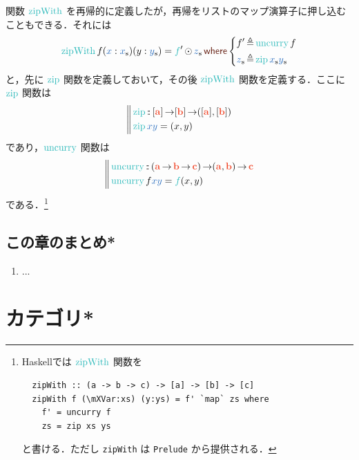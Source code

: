\documentclass[a5paper,twoside,fleqn,draft]{jsbook}
\def\keywordColor{Sepia}
\def\varColor{NavyBlue}
\def\funcColor{BlueGreen}
\def\typeColor{RedOrange}
\newcommand{\programminglanguage}[1]{\textsf{#1}}
\newcommand{\haskell}{\programminglanguage{Haskell}}
\newcommand{\code}[1]{\texttt{#1}}
\newcommand{\filename}[1]{\texttt{#1}}
\newcommand{\mBrace}{\Vert}
\newcommand{\mKeyword}[1]{\textcolor{\keywordColor}{\mathsf{#1}}}
\newcommand{\mWhereKeyword}{\mKeyword{where}}
\DeclareMathOperator{\mWhere}{\mWhereKeyword}
\newcommand{\mVar}[1]{\textcolor{\varColor}{#1}}
\newcommand{\mXVar}{\mVar{x}}
\newcommand{\mYVar}{\mVar{y}}
\newcommand{\mFunc}[1]{\textcolor{\funcColor}{#1}}
\newcommand{\mSpecialFunc}[1]{\textcolor{\funcColor}{\textrm{#1}}}
\newcommand{\mFFunc}{{\mFunc{f}}}
\DeclareMathOperator{\mUncurry}{\mSpecialFunc{uncurry}}
\DeclareMathOperator{\mZipFunc}{\mSpecialFunc{zip}}
\DeclareMathOperator{\mZipWith}{\mSpecialFunc{zipWith}}
\DeclareMathOperator{\mFuncArrow}{\rightarrow}
\DeclareMathOperator{\mIn}{{:\!:}}
\DeclareMathOperator{\mLetEq}{\triangleq}
\DeclareMathOperator{\mMapList}{\odot}
\newcommand{\mType}[1]{\textcolor{\typeColor}{\mathbf{#1}}}
\newcommand{\mA}{\mType{a}}
\newcommand{\mB}{\mType{b}}
\newcommand{\mC}{\mType{c}}
\newcommand{\mList}[1]{\mVar{#1}_\mathrm{s}}
\newcommand{\mProjEXP}[2]{#1\mFuncArrow#2} %
\begin{document}
関数 $\mZipWith$ を再帰的に定義したが，再帰をリストのマップ演算子に押し込むこともできる．それには
\begin{equation}
  \mZipWith f(\mXVar:\mList{x})(y:\mList{y})
  =\mFFunc'\mMapList\mList{z}
  \mWhere
  \left\{
  \begin{aligned}
    f'
    &\mLetEq\mUncurry f\\
    \mList{z}
    &\mLetEq\mZipFunc\mList{x}\mList{y}
  \end{aligned}
  \right.
\end{equation}
と，先に $\mZipFunc$ 関数を定義しておいて，その後 $\mZipWith$ 関数を定義する．ここに $\mZipFunc$ 関数は
\begin{equation}
  \left\mBrace
  \begin{aligned}
    {}&\mZipFunc\mIn{}\mProjEXP{[\mA]}
    {\mProjEXP{[\mB]}
      {([\mA],[\mB])}}\\
    {}&\mZipFunc \mXVar\mYVar=(x,y)
  \end{aligned}
  \right.
\end{equation}
であり，$\mUncurry$ 関数は
\begin{equation}
  \left\mBrace
  \begin{aligned}
    {}&\mUncurry\mIn{}
    \mProjEXP{(\mProjEXP{\mA }{\mProjEXP{\mB }{\mC }})}
          {\mProjEXP{(\mA ,\mB )}{\mC }}\\
          {}&\mUncurry f\mXVar\mYVar=\mFFunc(x,y)
  \end{aligned}
  \right.
\end{equation}
である．\footnote{\haskell では $\mZipWith$ 関数を
\begin{verbatim}
  zipWith :: (a -> b -> c) -> [a] -> [b] -> [c]
  zipWith f (\mXVar:xs) (y:ys) = f' `map` zs where
    f' = uncurry f
    zs = zip xs ys
\end{verbatim}
と書ける．ただし \code{zipWith} は \filename{Prelude} から提供される．}


\section{この章のまとめ*}

\begin{enumerate}
\item ...
\end{enumerate}

\chapter{カテゴリ*}
\label{ch:category}
\end{document}
